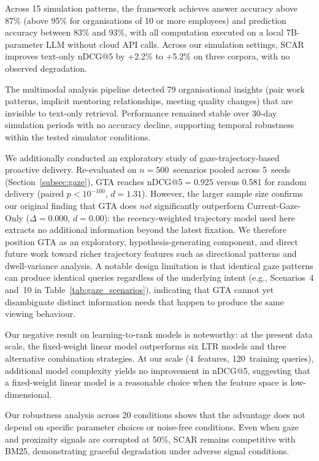 \documentclass[journal]{IEEEtran}
\begin{document}
Across 15 simulation patterns, the framework achieves answer accuracy above 87\% (above 95\% for organisations of 10 or more employees) and prediction accuracy between 83\% and 93\%, with all computation executed on a local 7B-parameter LLM without cloud API calls.
Across our simulation settings, SCAR improves text-only nDCG@5 by +2.2\% to +5.2\% on three corpora, with no observed degradation.

The multimodal analysis pipeline detected 79 organisational insights (pair work patterns, implicit mentoring relationships, meeting quality changes) that are invisible to text-only retrieval.
Performance remained stable over 30-day simulation periods with no accuracy decline, supporting temporal robustness within the tested simulator conditions.

We additionally conducted an exploratory study of gaze-trajectory-based
proactive delivery. Re-evaluated on $n{=}500$~scenarios pooled across 5~seeds
(Section~\ref{subsec:gaze}), GTA reaches nDCG@5${=}0.925$ versus 0.581 for
random delivery (paired $p < 10^{-100}$, $d = 1.31$). However, the larger
sample size confirms our original finding that GTA does \emph{not}
significantly outperform Current-Gaze-Only ($\Delta = 0.000$, $d = 0.00$):
the recency-weighted trajectory model used here extracts no additional
information beyond the latest fixation. We therefore position GTA as an
exploratory, hypothesis-generating component, and direct future work toward
richer trajectory features such as directional patterns and dwell-variance
analysis. A notable design limitation is that identical gaze patterns can
produce identical queries regardless of the underlying intent
(e.g., Scenarios~4 and~10 in Table~\ref{tab:gaze_scenarios}), indicating
that GTA cannot yet disambiguate distinct information needs that happen to
produce the same viewing behaviour.

Our negative result on learning-to-rank models is noteworthy: at the present data scale, the fixed-weight linear model outperforms six LTR models and three alternative combination strategies.
At our scale (4~features, 120~training queries), additional model complexity yields no improvement in nDCG@5, suggesting that a fixed-weight linear model is a reasonable choice when the feature space is low-dimensional.

Our robustness analysis across 20 conditions shows that the advantage does not depend on specific parameter choices or noise-free conditions.
Even when gaze and proximity signals are corrupted at 50\%, SCAR remains competitive with BM25, demonstrating graceful degradation under adverse signal conditions.
\end{document}
